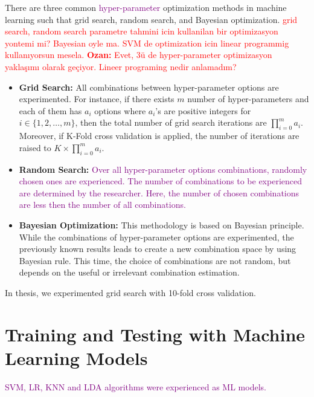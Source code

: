 There are three common \textcolor{purple}{hyper-parameter} optimization methods in machine learning such that grid search, random search, and Bayesian optimization.
\textcolor{red}{grid search, random search parametre tahmini icin kullanilan bir optimizasyon yontemi mi? Bayesian oyle ma. SVM de optimization icin linear programmig kullanıyorsun mesela. \textbf{Ozan:} Evet, 3ü de hyper-parameter optimizasyon yaklaşımı olarak geçiyor. Lineer programing nedir anlamadım?}


\begin{itemize}
    
    \item \textbf{Grid Search:} All combinations between hyper-parameter options are experimented. For instance, if there exists $m$ number of hyper-parameters and each of them has $a_{i}$ options where $a_{i}$'s are positive integers for $i \in \{1,2,\dots,m\}$, then the total number of grid search iterations are $\prod_{i=0}^{m} a_{i}$. Moreover, if K-Fold cross validation is applied, the number of iterations are raised to $K \times \prod_{i=0}^{m} a_{i}$.
    
    \item \textbf{Random Search:} \textcolor{purple}{Over all hyper-parameter options combinations, randomly chosen ones are experienced. The number of combinations to be experienced are determined by the researcher. Here, the number of chosen combinations are less then the number of all combinations.}
    
    \item \textbf{Bayesian Optimization:} This methodology is based on Bayesian principle. While the combinations of hyper-parameter options are experimented, the previously known results leads to create a new combination space by using Bayesian rule. This time, the choice of combinations are not random, but depends on the useful or irrelevant combination estimation.
    
\end{itemize}

In thesis, we experimented grid search with 10-fold cross validation.

\section{Training and Testing with Machine Learning Models} \label{CH5:train_test_ml}

\textcolor{purple}{SVM, LR, KNN and LDA algorithms were experienced as ML models.}

